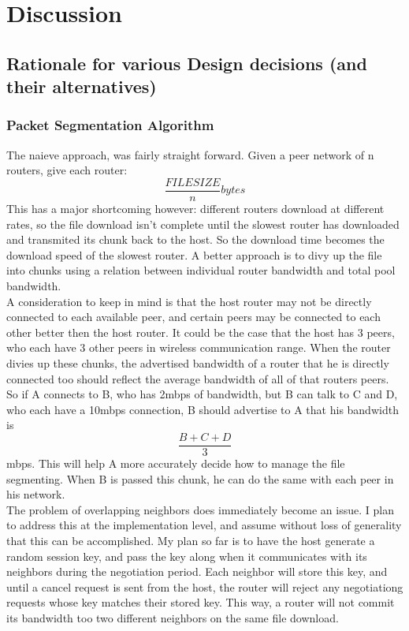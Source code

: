 \documentclass[12pt]{article}
\begin{document}
\section{Discussion}

	\subsection{Rationale for various Design decisions (and their alternatives)}

		\subsubsection{Packet Segmentation Algorithm}

			The naieve approach, was fairly straight forward. Given a peer network of n routers, give each router: $$\frac{FILESIZE}{n} bytes$$ This has a major shortcoming however: different routers download at different rates, so the file download isn't complete until the slowest router has downloaded and transmited its chunk back to the host. So the download time becomes the download speed of the slowest router. A better approach is to divy up the file into chunks using a relation between individual router bandwidth and total pool bandwidth. \\

			A consideration to keep in mind is that the host router may not be directly connected to each available peer, and certain peers may be connected to each other better then the host router. It could be the case that the host has 3 peers, who each have 3 other peers in wireless communication range. When the router divies up these chunks, the advertised bandwidth of a router that he is directly connected too should reflect the average bandwidth of all of that routers peers. So if A connects to B, who has 2mbps of bandwidth, but B can talk to C and D, who each have a 10mbps connection, B should advertise to A that his bandwidth is $$\frac{B + C + D}{3}$$ mbps. This will help A more accurately decide how to manage the file segmenting. When B is passed this chunk, he can do the same with each peer in his network. \\

			The problem of overlapping neighbors does immediately become an issue. I plan to address this at the implementation level, and assume without loss of generality that this can be accomplished. My plan so far is to have the host generate a random session key, and pass the key along when it communicates with its neighbors during the negotiation period. Each neighbor will store this key, and until a cancel request is sent from the host, the router will reject any negotiationg requests whose key matches their stored key. This way, a router will not commit its bandwidth too two different neighbors on the same file download. \\
\end{document}
